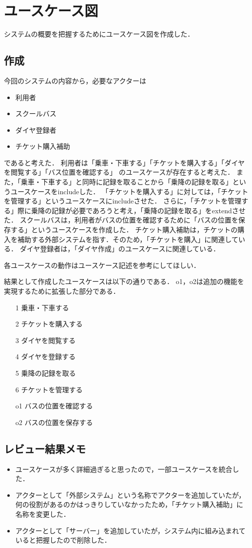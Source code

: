 \documentclass[documentclass]{jsarticle}
\begin{document}
\newpage

\section{ユースケース図}
システムの概要を把握するためにユースケース図を作成した．
\subsection*{作成}
今回のシステムの内容から，必要なアクターは
\begin{itemize}
  \item 利用者
  \item スクールバス
  \item ダイヤ登録者
  \item チケット購入補助
\end{itemize}
であると考えた．
利用者は「乗車・下車する」「チケットを購入する」「ダイヤを閲覧する」「バス位置を確認する」
のユースケースが存在すると考えた．
また，「乗車・下車する」と同時に記録を取ることから「乗降の記録を取る」というユースケースをincludeした．
「チケットを購入する」に対しては，「チケットを管理する」というユースケースにincludeさせた．
さらに，「チケットを管理する」際に乗降の記録が必要であろうと考え，「乗降の記録を取る」をextendさせた．
スクールバスは，利用者がバスの位置を確認するために「バスの位置を保存する」というユースケースを作成した．
チケット購入補助は，チケットの購入を補助する外部システムを指す．そのため，「チケットを購入」に関連している．
ダイヤ登録者は，「ダイヤ作成」のユースケースに関連している．

各ユースケースの動作はユースケース記述を参考にしてほしい．

結果として作成したユースケースは以下の通りである．
o1，o2は追加の機能を実現するために拡張した部分である．
\begin{itemize}
  \item[1] 乗車・下車する
  \item[2] チケットを購入する
  \item[3] ダイヤを閲覧する
  \item[4] ダイヤを登録する
  \item[5] 乗降の記録を取る
  \item[6] チケットを管理する
  \item[o1] バスの位置を確認する
  \item[o2] バスの位置を保存する       
\end{itemize}

\subsection*{レビュー結果メモ}
\begin{itemize}
  \item ユースケースが多く詳細過ぎると思ったので，一部ユースケースを統合した．
  \item アクターとして「外部システム」という名称でアクターを追加していたが，
  何の役割があるのかはっきりしていなかったため，「チケット購入補助」に名称を変更した．
  \item アクターとして「サーバー」を追加していたが，システム内に組み込まれていると把握したので削除した．
\end{itemize}
\end{document}
